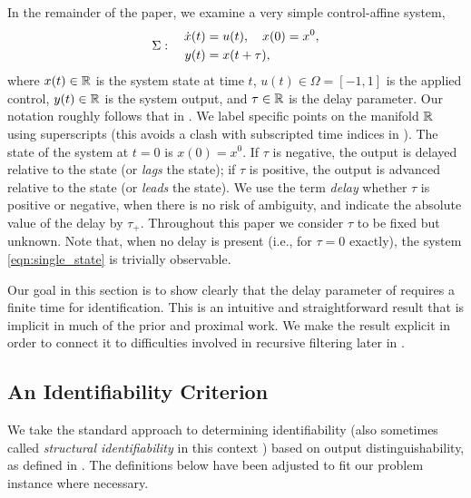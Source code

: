\documentclass[letterpaper,10pt,conference]{ieeeconf}
\theoremstyle{definition}
\begin{document}
In the remainder of the paper, we examine a very simple control-affine system,
%
\begin{equation}
\label{eqn:single_state}
 \Sigma  : \quad
\begin{aligned}
\dot{x}(t) & = u(t),
\quad x(0) = x^{0},\\	
y(t) & = x(t + \tau),
\end{aligned}
\end{equation}
%
where $x(t) \in \mathbb{R}$ is the system state at time $t$, $u(t) \in \Omega = [-1, 1]$ is the applied control, $y(t) \in \mathbb{R}$ is the system output, and $\tau \in \mathbb{R}$ is the delay parameter.
%
Our notation roughly follows that in \cite{1977_Hermann_Nonlinear}. We label specific points on the manifold $\mathbb{R}$ using superscripts (this avoids a clash with subscripted time indices in ).
%
The state of the system at $t = 0$ is $x(0) = x^{0}$.
%
If $\tau$ is negative, the output is delayed relative to the state (or \emph{lags} the state); if $\tau$ is positive, the output is advanced relative to the state (or \emph{leads} the state).
%
We use the term \emph{delay} whether $\tau$ is positive or negative, when there is no risk of ambiguity, and indicate the absolute value of the delay by $\tau_{+}$.
%
Throughout this paper we consider $\tau$ to be fixed but unknown. 
%
Note that, when no delay is present (i.e., for $\tau = 0$ exactly), the system \cref{eqn:single_state} is trivially observable.

Our goal in this section is to show clearly that the delay parameter of  requires a finite time for identification.
%
This is an intuitive and straightforward result that is implicit in much of the prior and proximal work. 
%
We make the result explicit in order to connect it to difficulties involved in recursive filtering later in .

\subsection{An Identifiability Criterion}
\label{subsec:ident_criterion}

We take the standard approach to determining identifiability (also sometimes called \emph{structural identifiability} in this context \cite{1970_Bellman_Structural}) based on output distinguishability, as defined in \cite{1976_Grewal_Identifiability}.
%
The definitions below have been adjusted to fit our problem instance where necessary.
\end{document}
